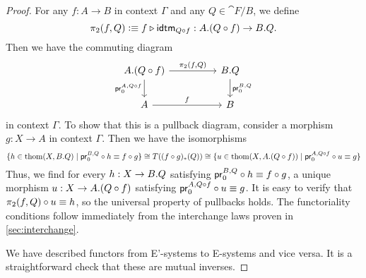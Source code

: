 \begin{proof}
For any $f:A\to B$ in context $\Gamma$ and any $Q\in\cat{F}/B$, we define
\begin{equation*}
\pi_2(f,Q)\defeq \jvcomp{\jcomp{A}{f}{Q}}{f}{\tfid{\jcomp{A}{f}{Q}}}
  : \ctxext{A}{\jcomp{A}{f}{Q}}\to\ctxext{B}{Q}.
\end{equation*}
Then we have the commuting diagram
\begin{equation*}
\begin{tikzcd}[column sep=huge]
\ctxext{A}{\jcomp{A}{f}{Q}} \arrow[r,"{\pi_2(f,Q)}"] \arrow[d,swap,"{\cprojfstf{A}{\jcomp{A}{f}{Q}}}"] & \ctxext{B}{Q} \arrow[d,"{\cprojfstf{B}{Q}}"] \\
A \arrow[r,"f"] & B
\end{tikzcd}
\end{equation*}
in context $\Gamma$. To show that this is a pullback diagram, consider a
morphism $g:X\to A$ in context $\Gamma$. Then we have the isomorphisms
\begin{equation*}
\{h\in\thom{X}{\ctxext{B}{Q}}\mid \jcomp{X}{h}{\cprojfstf{B}{Q}}\jdeq\jcomp{X}{g}{f}\}
  \cong
T((\jcomp{X}{g}{f})_\ast(Q))
  \cong
\{u\in\thom{X}{\ctxext{A}{\jcomp{A}{f}{Q}}}\mid\jcomp{X}{u}{\cprojfstf{A}{\jcomp{A}{f}{Q}}}\jdeq g\}
\end{equation*}
Thus, we find for every $h:X\to\ctxext{B}{Q}$ satisfying
$\jcomp{X}{h}{\cprojfstf{B}{Q}}\jdeq\jcomp{X}{g}{f}$, a unique morphism
$u:X\to\ctxext{A}{\jcomp{A}{f}{Q}}$ satisfying
$\jcomp{X}{u}{\cprojfstf{A}{\jcomp{A}{f}{Q}}}\jdeq g$. It is easy to verify
that $\jcomp{X}{u}{\pi_2(f,Q)}\jdeq h$, so the universal property of pullbacks
holds. The functoriality conditions follow immediately from the interchange
laws proven in \autoref{sec:interchange}.

We have described functors from E'-systems to E-systems and vice versa. It is
a straightforward check that these are mutual inverses.
\end{proof}

